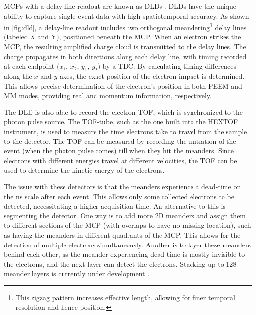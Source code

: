 \Glspl{MCP} with a delay-line readout are known as \glspl{DLD} \cite{oelsnerMicrospectroscopyImagingUsing2001}. \Glspl{DLD} have the unique ability to capture single-event data with high spatiotemporal accuracy. As shown in \cref{fig:dld}, a delay-line readout includes two orthogonal meandering\footnote{This zigzag pattern increases effective length, allowing for finer temporal resolution and hence position.} delay lines (labeled X and Y), positioned beneath the MCP. When an electron strikes the \gls{MCP}, the resulting amplified charge cloud is transmitted to the delay lines. The charge propagates in both directions along each delay line, with timing recorded at each endpoint ($x_1$, $x_2$, $y_1$, $y_2$) by a \gls{TDC}. By calculating timing differences along the $x$ and $y$ axes, the exact position of the electron impact is determined. This allows precise determination of the electron's position in both \gls{PEEM} and \gls{MM} modes, providing real and momentum information, respectively.

The \gls{DLD} is also able to record the electron \gls{TOF}, which is synchronized to the photon pulse source. The \gls{TOF}-tube, such as the one built into the \gls{HEXTOF} instrument, is used to measure the time electrons take to travel from the sample to the detector. The \gls{TOF} can be measured by recording the initiation of the event (when the photon pulse comes) till when they hit the meanders. Since electrons with different energies travel at different velocities, the \gls{TOF} can be used to determine the kinetic energy of the electrons.

The issue with these detectors is that the meanders experience a dead-time on the \unit{ns} scale after each event. This allows only some collected electrons to be detected, necessitating a higher acquisition time. An alternative to this is segmenting the detector. One way is to add more 2D meanders and assign them to different sections of the \gls{MCP} (with overlaps to have no missing location), such as having the meanders in different quadrants of the \gls{MCP}. This allows for the detection of multiple electrons simultaneously. Another is to layer these meanders behind each other, as the meander experiencing dead-time is mostly invisible to the electrons, and the next layer can detect the electrons. Stacking up to \num{128} meander layers is currently under development \cite{oelsnerTimeEnergyResolved2010}.

